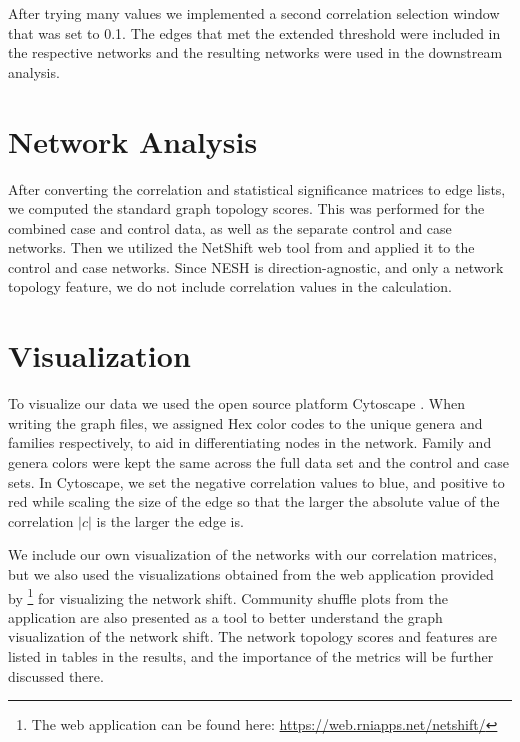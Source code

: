 After trying many values we implemented a second correlation selection window that was set to 0.1. The edges that met the extended threshold were included in the respective networks and the resulting networks were used in the downstream analysis. 

\section{Network Analysis}\label{meth:net_analysis}
After converting the correlation and statistical significance matrices to edge lists, we computed the standard graph topology scores. This was performed for the combined case and control data, as well as the separate control and case networks. Then we utilized the NetShift web tool from \citet{Kuntal2018} and applied it to the control and case networks. Since \acrshort{NESH} is direction-agnostic, and only a network topology feature, we do not include correlation values in the calculation.

\section{Visualization}\label{meth:viz}
To visualize our data we used the open source platform Cytoscape \citep{Shannon2003_cytoscape}. When writing the graph files, we assigned Hex color codes to the unique genera and families respectively, to aid in differentiating nodes in the network. Family and genera colors were kept the same across the full data set and the control and case sets. In Cytoscape, we set the negative correlation values to blue, and positive to red while scaling the size of the edge so that the larger the absolute value of the correlation $|c|$ is the larger the edge is. 

We include our own visualization of the networks with our correlation matrices, but we also used the visualizations obtained from the web application provided by \citeauthor{Kuntal2018}\footnote{The web application can be found here: \url{https://web.rniapps.net/netshift/}} for visualizing the network shift. Community shuffle plots from the application are also presented as a tool to better understand the graph visualization of the network shift. The network topology scores and features are listed in tables in the results, and the importance of the metrics will be further discussed there. 






